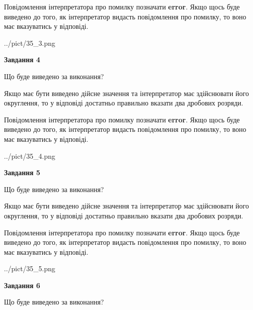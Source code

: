 \documentclass[12pt, ukrainian]{article}
\begin{document}
{\begin {Large}
Повідомлення інтерпретатора про помилку позначати \textbf{error}.
Якщо щось буде виведено до того, як інтерпретатор видасть повідомлення про помилку, 
то воно має вказуватись у відповіді. \par

\begin{center}
	{../pict/35_3.png}
\end{center}
\newpage

{\begin {center}\textbf{Завдання 4}\end {center}}\par
Що буде виведено за виконання? \par

Якщо має бути виведено дійсне значення та інтерпретатор має здійснювати його округлення, 
то у відповіді достатньо правильно вказати два дробових розряди.

Повідомлення інтерпретатора про помилку позначати \textbf{error}.
Якщо щось буде виведено до того, як інтерпретатор видасть повідомлення про помилку, 
то воно має вказуватись у відповіді. \par

\begin{center}
	{../pict/35_4.png}
\end{center}
\newpage

{\begin {center}\textbf{Завдання 5}\end {center}}\par
Що буде виведено за виконання? \par

Якщо має бути виведено дійсне значення та інтерпретатор має здійснювати його округлення, 
то у відповіді достатньо правильно вказати два дробових розряди.

Повідомлення інтерпретатора про помилку позначати \textbf{error}.
Якщо щось буде виведено до того, як інтерпретатор видасть повідомлення про помилку, 
то воно має вказуватись у відповіді. \par

\begin{center}
	{../pict/35_5.png}
\end{center}
\newpage

{\begin {center}\textbf{Завдання 6}\end {center}}\par
Що буде виведено за виконання? \par


\end{Large}}
\end{document}
